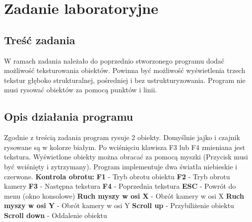\documentclass{article}
\begin{document}
    \section{Zadanie laboratoryjne}
        \subsection{Treść zadania}
            W ramach zadania należało do poprzednio stworzonego programu dodać możliwość 
            teksturowania obiektów. Powinna być możliwość wyświetlenia trzech tekstur 
            głęboko strukturalnej, pośredniej i bez ustrukturyzowania. Program nie musi
            rysować obiektów za pomocą punktów i linii.
        \subsection{Opis działania programu}
            \raggedright
            Zgodnie z treścią zadania program rysuje 2 obiekty. Domyślnie 
            jajko i czajnik rysowane są w kolorze białym. Po wciśnięciu klawisza F3 lub F4
            zmieniana jest tekstura. Wyświetlone obiekty można obracać za pomocą myszki 
            (Przycisk musi być wciśnięty i zytrzymany). Program implementuje dwa światła 
            niebieskie i czerwone.\linebreak 
            \textbf{Kontrola obrotu:}\linebreak  
            \textbf{F1} - Tryb obrotu obiektu\linebreak
            \textbf{F2} - Tryb obrotu kamery\linebreak
            \textbf{F3} - Następna tekstura\linebreak
            \textbf{F4} - Poprzednia tekstura\linebreak
            \textbf{ESC} - Powrót do menu (okno konsolowe)\linebreak 
            \textbf{Ruch myszy w osi X} - Obrót kamery w osi X\linebreak 
            \textbf{Ruch myszy w osi Y} - Obrót kamery w osi Y\linebreak 
            \textbf{Scroll up} - Przybiliżenie obiektu\linebreak 
            \textbf{Scroll down} - Oddalenie obiektu\linebreak 
\end{document}

